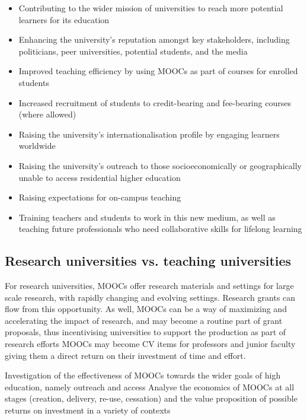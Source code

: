 \begin{itemize}

\item Contributing to the wider mission of universities to reach more
potential learners for its education
\item  Enhancing the university's
reputation amongst key stakeholders, including politicians, peer
universities, potential students, and the media 
\item Improved teaching efficiency  by using MOOCs as part of courses
  for enrolled students 
\item Increased recruitment of students to credit-bearing and
  fee-bearing courses (where allowed)
\item Raising the university's
internationalisation profile  by engaging learners
worldwide
\item  Raising the university's outreach to those socioeconomically or
  geographically unable to
access residential higher education
\item Raising expectations for
on-campus teaching
\item Training teachers and
students to work  in this new medium, as well as teaching future
professionals who need collaborative skills for lifelong learning 

\end{itemize}


\subsection{Research universities vs. teaching universities}


For
research universities, MOOCs offer research
materials and settings for large scale research, with rapidly changing
and evolving settings. Research grants can flow from this opportunity.
As well, MOOCs can be a way of maximizing and accelerating the impact of
research, and may become a routine part of grant proposals, thus
incentivising universities to support the production as part of research
efforts MOOCs may become CV items for professors and junior faculty
giving them a direct return on their investment of time and effort.

Investigation of the effectiveness of
MOOCs towards the wider goals of high education, namely outreach and
access Analyse the economics of MOOCs at all stages (creation, delivery,
re-use, cessation) and the value proposition of possible returns on
investment in a variety of contexts 

